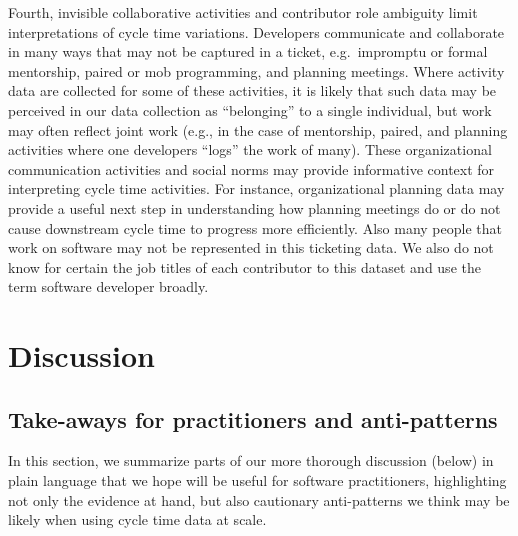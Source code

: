 \documentclass[
]{article}
\begin{document}
Fourth, invisible collaborative activities and contributor role
ambiguity limit interpretations of cycle time variations. Developers
communicate and collaborate in many ways that may not be captured in a
ticket, e.g.~impromptu or formal mentorship, paired or mob programming,
and planning meetings. Where activity data are collected for some of
these activities, it is likely that such data may be perceived in our
data collection as ``belonging'' to a single individual, but work may
often reflect joint work (e.g., in the case of mentorship, paired, and
planning activities where one developers ``logs'' the work of many).
These organizational communication activities and social norms may
provide informative context for interpreting cycle time activities. For
instance, organizational planning data may provide a useful next step in
understanding how planning meetings do or do not cause downstream cycle
time to progress more efficiently. Also many people that work on
software may not be represented in this ticketing data. We also do not
know for certain the job titles of each contributor to this dataset and
use the term software developer broadly.

\section{Discussion}\label{discussion}

\subsection{Take-aways for practitioners and
anti-patterns}\label{take-aways-for-practitioners-and-anti-patterns}

In this section, we summarize parts of our more thorough discussion
(below) in plain language that we hope will be useful for software
practitioners, highlighting not only the evidence at hand, but also
cautionary anti-patterns we think may be likely when using cycle time
data at scale.
\end{document}
